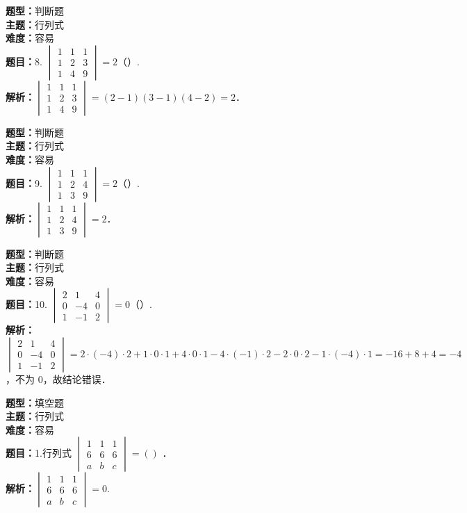 \documentclass{ctexart}
\newenvironment{question}[5]{%
	\noindent\textbf{题型：}#1\\
	\textbf{主题：}#2\\
	\textbf{难度：}#3\\
	\textbf{题目：}#4\\
	\textbf{解析：}#5\\
	\vspace{1em}
}{}
\begin{document}
	\begin{question}
		{判断题}
		{行列式}
		{容易}
		{8. \(\begin{vmatrix} 1 & 1 & 1 \\ 1 & 2 & 3 \\ 1 & 4 & 9\end{vmatrix}=2\)（）. }
		{\(\begin{vmatrix} 1 & 1 & 1 \\ 1 & 2 & 3 \\ 1 & 4 & 9\end{vmatrix} = (2-1)(3-1)(4-2) = 2\)．}
	\end{question}
	
	\begin{question}
		{判断题}
		{行列式}
		{容易}
		{9. \(\begin{vmatrix} 1 & 1 & 1 \\ 1 & 2 & 4 \\ 1 & 3 & 9\end{vmatrix}=2\)（）. }
		{\(\begin{vmatrix} 1 & 1 & 1 \\ 1 & 2 & 4 \\ 1 & 3 & 9\end{vmatrix} = 2\)．}
	\end{question}
	
	\begin{question}
		{判断题}
		{行列式}
		{容易}
		{10. \(\begin{vmatrix} 2 & 1 & 4 \\ 0 & -4 & 0 \\ 1 & -1 & 2\end{vmatrix}=0\)（）. }
		{\(\begin{vmatrix} 2 & 1 & 4 \\ 0 & -4 & 0 \\ 1 & -1 & 2\end{vmatrix} = 2 \cdot (-4) \cdot 2 + 1 \cdot 0 \cdot 1 + 4 \cdot 0 \cdot 1 - 4 \cdot (-1) \cdot 2 - 2 \cdot 0 \cdot 2 - 1 \cdot (-4) \cdot 1 = -16 + 8 + 4 = -4\)，不为 0，故结论错误．}
	\end{question}
	
	
	
	
	
	
	
	
	
	
	
	
	
	
	
	
	
	
	\begin{question}
		{填空题}
		{行列式}
		{容易}
		{1.行列式 \(\begin{vmatrix} 1 & 1 & 1 \\ 6 & 6 & 6 \\ a & b & c\end{vmatrix}=()\) ．}
		{\(\begin{vmatrix} 1 & 1 & 1 \\ 6 & 6 & 6 \\ a & b & c\end{vmatrix}=0\).}
	\end{question}
	
\end{document}
